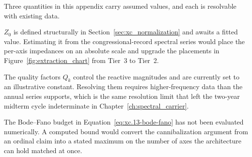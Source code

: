 Three quantities in this appendix carry assumed values, and each is resolvable with existing data.

$Z_0$ is defined structurally in Section~\ref{sec:xc_normalization} and awaits a fitted value.
Estimating it from the congressional-record spectral series would place the per-axis impedances on
an absolute scale and upgrade the placements in Figure~\ref{fig:extraction_chart} from Tier~3 to
Tier~2.

The quality factors $Q_k$ control the reactive magnitudes and are currently set to an illustrative
constant. Resolving them requires higher-frequency data than the annual series supports, which is
the same resolution limit that left the two-year midterm cycle indeterminate in
Chapter~\ref{ch:spectral_carrier}.

The Bode--Fano budget in Equation~\ref{eq:xc.13-bode-fano} has not been evaluated numerically. A
computed bound would convert the cannibalization argument from an ordinal claim into a stated
maximum on the number of axes the architecture can hold matched at once.
